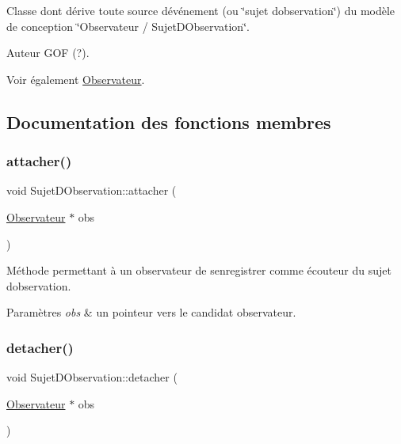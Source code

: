 Classe dont dérive toute source d\textquotesingle{}événement (ou \char`\"{}sujet d\textquotesingle{}observation\char`\"{}) du modèle de conception \char`\"{}\+Observateur / Sujet\+D\+Observation\char`\"{}.

\begin{DoxyAuthor}{Auteur}
G\+OF (?). 
\end{DoxyAuthor}
\begin{DoxySeeAlso}{Voir également}
\mbox{\hyperlink{class_observateur}{Observateur}}. 
\end{DoxySeeAlso}


\subsection{Documentation des fonctions membres}
\mbox{\label{class_sujet_d_observation_a697269174b77f64d270e839ab5557a1e}} 
\subsubsection{\texorpdfstring{attacher()}{attacher()}}
{\footnotesize\ttfamily void Sujet\+D\+Observation\+::attacher (\begin{DoxyParamCaption}\item[{\mbox{\hyperlink{class_observateur}{Observateur}} $\ast$}]{obs }\end{DoxyParamCaption})\hspace{0.3cm}{\ttfamily [virtual]}}



Méthode permettant à un observateur de s\textquotesingle{}enregistrer comme écouteur du sujet d\textquotesingle{}observation. 


\begin{DoxyParams}{Paramètres}
{\em obs} & un pointeur vers le candidat observateur. \\
\hline
\end{DoxyParams}
\mbox{\label{class_sujet_d_observation_a05e8d7285a4f1c79d9f53e274653ea1b}} 
\subsubsection{\texorpdfstring{detacher()}{detacher()}}
{\footnotesize\ttfamily void Sujet\+D\+Observation\+::detacher (\begin{DoxyParamCaption}\item[{\mbox{\hyperlink{class_observateur}{Observateur}} $\ast$}]{obs }\end{DoxyParamCaption})\hspace{0.3cm}{\ttfamily [virtual]}}



